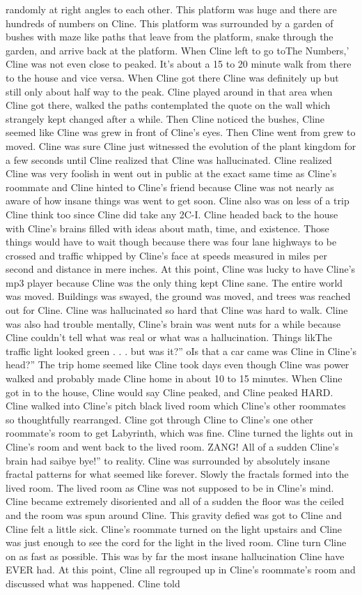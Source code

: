\documentclass[12pt]{book}
\begin{document}
randomly at right angles to each other. This platform was huge and there are hundreds of numbers on Cline. This platform was surrounded by a garden of bushes with maze like paths that leave from the platform, snake through the garden, and arrive back at the platform. When Cline left to go toThe Numbers,' Cline was not even close to peaked. It's about a 15 to 20 minute walk from there to the house and vice versa. When Cline got there Cline was definitely up but still only about half way to the peak. Cline played around in that area when Cline got there, walked the paths contemplated the quote on the wall which strangely kept changed after a while. Then Cline noticed the bushes, Cline seemed like Cline was grew in front of Cline's eyes. Then Cline went from grew to moved. Cline was sure Cline just witnessed the evolution of the plant kingdom for a few seconds until Cline realized that Cline was hallucinated. Cline realized Cline was very foolish in went out in public at the exact same time as Cline's roommate and Cline hinted to Cline's friend because Cline was not nearly as aware of how insane things was went to get soon. Cline also was on less of a trip Cline think too since Cline did take any 2C-I. Cline headed back to the house with Cline's brains filled with ideas about math, time, and existence. Those things would have to wait though because there was four lane highways to be crossed and traffic whipped by Cline's face at speeds measured in miles per second and distance in mere inches. At this point, Cline was lucky to have Cline's mp3 player because Cline was the only thing kept Cline sane. The entire world was moved. Buildings was swayed, the ground was moved, and trees was reached out for Cline. Cline was hallucinated so hard that Cline was hard to walk. Cline was also had trouble mentally, Cline's brain was went nuts for a while because Cline couldn't tell what was real or what was a hallucination. Things likThe traffic light looked green . . . but was it?'' oIs that a car came was Cline in Cline's head?'' The trip home seemed like Cline took days even though Cline was power walked and probably made Cline home in about 10 to 15 minutes. When Cline got in to the house, Cline would say Cline peaked, and Cline peaked HARD. Cline walked into Cline's pitch black lived room which Cline's other roommates so thoughtfully rearranged. Cline got through Cline to Cline's one other roommate's room to get Labyrinth, which was fine. Cline turned the lights out in Cline's room and went back to the lived room. ZANG! All of a sudden Cline's brain had saibye bye!'' to reality. Cline was surrounded by absolutely insane fractal patterns for what seemed like forever. Slowly the fractals formed into the lived room. The lived room as Cline was not supposed to be in Cline's mind. Cline became extremely disoriented and all of a sudden the floor was the ceiled and the room was spun around Cline. This gravity defied was got to Cline and Cline felt a little sick. Cline's roommate turned on the light upstairs and Cline was just enough to see the cord for the light in the lived room. Cline turn Cline on as fast as possible. This was by far the most insane hallucination Cline have EVER had. At this point, Cline all regrouped up in Cline's roommate's room and discussed what was happened. Cline told 
\end{document}
